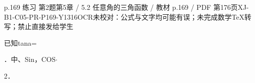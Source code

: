 \begin{bankitem}{p.169 练习 第2题}{第5章 / 5.2 任意角的三角函数 / 教材 p.169 / PDF 第176页}{XJ-B1-C05-PR-P169-Y1316}{OCR未校对：公式与文字均可能有误；未完成数学TeX转写；禁止直接发给学生}
\begin{ocrdraft}
\par
已知tana=
\par
．中、Sin，COS\ensuremath{\cdot}
\par
2．
\end{ocrdraft}
\end{bankitem}
